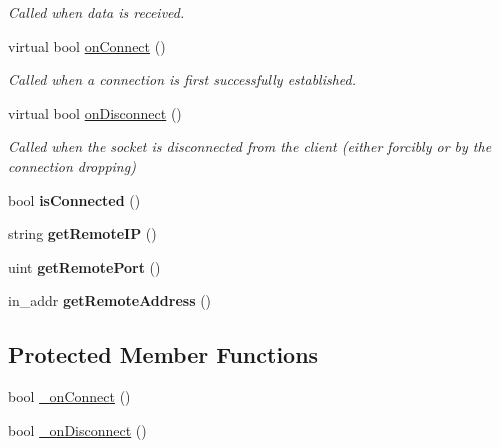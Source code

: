 \begin{DoxyCompactItemize}
\begin{DoxyCompactList}\small\item\em Called when data is received. \item\end{DoxyCompactList}\item 
\hypertarget{classSocket_aaffd9bd4957e367504e7ddf5922d2e46}{
virtual bool \hyperlink{classSocket_aaffd9bd4957e367504e7ddf5922d2e46}{onConnect} ()}
\label{classSocket_aaffd9bd4957e367504e7ddf5922d2e46}

\begin{DoxyCompactList}\small\item\em Called when a connection is first successfully established. \item\end{DoxyCompactList}\item 
\hypertarget{classSocket_a5b9025afbd7a8f3b79128f371d7a7bd1}{
virtual bool \hyperlink{classSocket_a5b9025afbd7a8f3b79128f371d7a7bd1}{onDisconnect} ()}
\label{classSocket_a5b9025afbd7a8f3b79128f371d7a7bd1}

\begin{DoxyCompactList}\small\item\em Called when the socket is disconnected from the client (either forcibly or by the connection dropping) \item\end{DoxyCompactList}\item 
\hypertarget{classSocket_a60c76a4c1e26192218d598b63cbb97b9}{
bool {\bfseries isConnected} ()}
\label{classSocket_a60c76a4c1e26192218d598b63cbb97b9}

\item 
\hypertarget{classSocket_ab54ab05b7088f40f9b9c9704d313cc68}{
string {\bfseries getRemoteIP} ()}
\label{classSocket_ab54ab05b7088f40f9b9c9704d313cc68}

\item 
\hypertarget{classSocket_a51a7d030a6a561b53be1c8bf2c2de552}{
uint {\bfseries getRemotePort} ()}
\label{classSocket_a51a7d030a6a561b53be1c8bf2c2de552}

\item 
\hypertarget{classSocket_a7d9eae997fba47664fdc87227f3ed2e8}{
in\_\-addr {\bfseries getRemoteAddress} ()}
\label{classSocket_a7d9eae997fba47664fdc87227f3ed2e8}

\end{DoxyCompactItemize}
\subsection*{Protected Member Functions}
\begin{DoxyCompactItemize}
\item 
bool \hyperlink{classSocket_af4bdee68ba070ca8e80aa61a93823924}{\_\-onConnect} ()
\item 
bool \hyperlink{classSocket_ae53f8b0e9b333ff473aa8f0883e2b854}{\_\-onDisconnect} ()
\end{DoxyCompactItemize}


